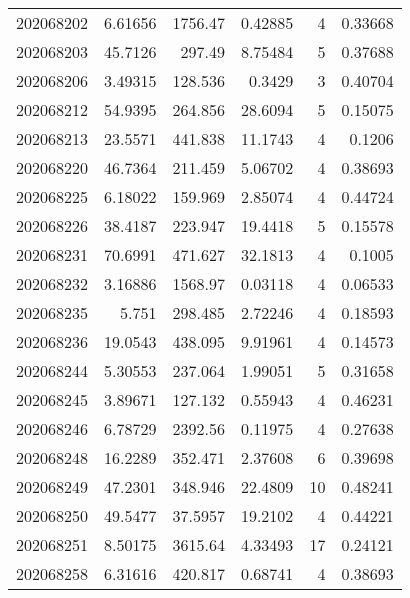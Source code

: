 \begin{tabular}{rrrrrr}
 202068202 &          6.61656 &     1756.47   &            0.42885 &           4 & 0.33668 \\
 202068203 &         45.7126  &      297.49   &            8.75484 &           5 & 0.37688 \\
 202068206 &          3.49315 &      128.536  &            0.3429  &           3 & 0.40704 \\
 202068212 &         54.9395  &      264.856  &           28.6094  &           5 & 0.15075 \\
 202068213 &         23.5571  &      441.838  &           11.1743  &           4 & 0.1206  \\
 202068220 &         46.7364  &      211.459  &            5.06702 &           4 & 0.38693 \\
 202068225 &          6.18022 &      159.969  &            2.85074 &           4 & 0.44724 \\
 202068226 &         38.4187  &      223.947  &           19.4418  &           5 & 0.15578 \\
 202068231 &         70.6991  &      471.627  &           32.1813  &           4 & 0.1005  \\
 202068232 &          3.16886 &     1568.97   &            0.03118 &           4 & 0.06533 \\
 202068235 &          5.751   &      298.485  &            2.72246 &           4 & 0.18593 \\
 202068236 &         19.0543  &      438.095  &            9.91961 &           4 & 0.14573 \\
 202068244 &          5.30553 &      237.064  &            1.99051 &           5 & 0.31658 \\
 202068245 &          3.89671 &      127.132  &            0.55943 &           4 & 0.46231 \\
 202068246 &          6.78729 &     2392.56   &            0.11975 &           4 & 0.27638 \\
 202068248 &         16.2289  &      352.471  &            2.37608 &           6 & 0.39698 \\
 202068249 &         47.2301  &      348.946  &           22.4809  &          10 & 0.48241 \\
 202068250 &         49.5477  &       37.5957 &           19.2102  &           4 & 0.44221 \\
 202068251 &          8.50175 &     3615.64   &            4.33493 &          17 & 0.24121 \\
 202068258 &          6.31616 &      420.817  &            0.68741 &           4 & 0.38693 \\

\end{tabular}
